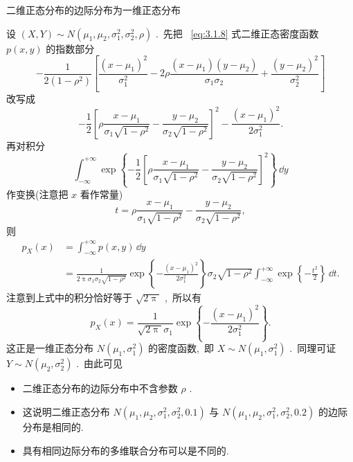   \begin{example}\label{exam:3.2.5}
  	二维正态分布的边际分布为一维正态分布
  \end{example}
  \begin{solution}
  	设 $(X,Y)\sim N(\mu_1,\mu_2,\sigma_1^2,\sigma_2^2,\rho)$ .\ 先把 ~\ref{eq:3.1.8} 式二维正态密度函数 $p(x,y)$ 的指数部分
  	\begin{equation*}
  	-\frac{1}{2(1-\rho^2)}\left[\frac{(x-\mu_1)^2}{\sigma_1^2}-2\rho\frac{(x-\mu_1)(y-\mu_2)}{\sigma_1\sigma_2}+\frac{(y-\mu_2)^2}{\sigma_2^2}\right]
  	\end{equation*}
  	改写成
  	\begin{equation*}
  	-\frac{1}{2}\left[\rho\frac{x-\mu_1}{\sigma_1\sqrt{1-\rho^2}}-\frac{y-\mu_2}{\sigma_2\sqrt{1-\rho^2}}\right]^2-\frac{(x-\mu_1)^2}{2\sigma_1^2}.
  	\end{equation*}
  	再对积分
  	\begin{equation*}
  	\int_{-\infty}^{+\infty}\exp\left\{-\frac{1}{2}\left[\rho\frac{x-\mu_1}{\sigma_1\sqrt{1-\rho^2}}-\frac{y-\mu_2}{\sigma_2\sqrt{1-\rho^2}}\right]^2\right\}\,\dd y
  	\end{equation*}
  	作变换(注意把 $x$ 看作常量)
  	\begin{equation*}
  	t=\rho\frac{x-\mu_1}{\sigma_1\sqrt{1-\rho^2}}-\frac{y-\mu_2}{\sigma_2\sqrt{1-\rho^2}},
  	\end{equation*}
  	则
  	\begin{align*}
  	p_{X}(x) &= \int_{-\infty}^{+\infty}p(x,y)\,\dd y\\
  	&=\frac{1}{2\uppi\sigma_1\sigma_2\sqrt{1-\rho^2}}\exp\left\{-\frac{(x-\mu_1)^2}{2\sigma_1^2}\right\}\sigma_2\sqrt{1-\rho^2}\int_{-\infty}^{+\infty}\exp\left\{-\frac{t^2}{2}\right\}\,\dd t.
  	\end{align*}
  	注意到上式中的积分恰好等于 $\sqrt{2\uppi}$ ,\ 所以有
  	\begin{equation*}
  	p_{X}(x)=\frac{1}{\sqrt{2\uppi}\sigma_1}\exp\left\{-\frac{(x-\mu_1)^2}{2\sigma_1^2}\right\}.
  	\end{equation*}
  	这正是一维正态分布 $N(\mu_1,\sigma_1^2)$ 的密度函数,\ 即 $X\sim N(\mu_1,\sigma_1^2)$ .\ 同理可证 $Y\sim N(\mu_2,\sigma_2^2)$ .\ 由此可见
  	\begin{itemize}
  		\item 二维正态分布的边际分布中不含参数 $\rho$ .
  		\item 这说明二维正态分布 $N(\mu_1,\mu_2,\sigma_1^2,\sigma_2^2,0.1)$ 与 $N(\mu_1,\mu_2,\sigma_1^2,\sigma_2^2,0.2)$ 的边际分布是相同的.
  		\item 具有相同边际分布的多维联合分布可以是不同的.
  	\end{itemize}
  \end{solution}
  
